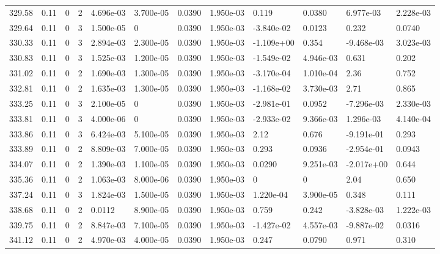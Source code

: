 \documentclass[preview]{standalone}
\begin{document}
{{{{{{{{{{{\begin{tabular}{L{1.2cm}C{1.2cm} C{0.3cm}C{0.5cm} C{1.4cm}C{1.4cm} C{1.4cm}C{1.4cm} C{1.6cm}C{1.6cm} C{1.6cm}C{1.6cm}}
  329.58  &  0.11  & 0     &  2 &  4.696e-03  & 3.700e-05  &  0.0390&   1.950e-03& 0.119 & 0.0380   &  6.977e-03 & 2.228e-03  \\ 
  329.64  &  0.11  & 0     &  3 &  1.500e-05  & 0  &  0.0390&   1.950e-03& -3.840e-02 & 0.0123   &  0.232 & 0.0740  \\ 
  330.33  &  0.11  & 0     &  3 &  2.894e-03  & 2.300e-05  &  0.0390&   1.950e-03& -1.109e+00 & 0.354   &  -9.468e-03 & 3.023e-03  \\ 
  330.83  &  0.11  & 0     &  3 &  1.525e-03  & 1.200e-05  &  0.0390&   1.950e-03& -1.549e-02 & 4.946e-03   &  0.631 & 0.202  \\ 
  331.02  &  0.11  & 0     &  2 &  1.690e-03  & 1.300e-05  &  0.0390&   1.950e-03& -3.170e-04 & 1.010e-04   &  2.36 & 0.752  \\ 
  332.81  &  0.11  & 0     &  2 &  1.635e-03  & 1.300e-05  &  0.0390&   1.950e-03& -1.168e-02 & 3.730e-03   &  2.71 & 0.865  \\ 
  333.25  &  0.11  & 0     &  3 &  2.100e-05  & 0  &  0.0390&   1.950e-03& -2.981e-01 & 0.0952   &  -7.296e-03 & 2.330e-03  \\ 
  333.81  &  0.11  & 0     &  3 &  4.000e-06  & 0  &  0.0390&   1.950e-03& -2.933e-02 & 9.366e-03   &  1.296e-03 & 4.140e-04  \\ 
  333.86  &  0.11  & 0     &  3 &  6.424e-03  & 5.100e-05  &  0.0390&   1.950e-03& 2.12 & 0.676   &  -9.191e-01 & 0.293  \\ 
  333.89  &  0.11  & 0     &  2 &  8.809e-03  & 7.000e-05  &  0.0390&   1.950e-03& 0.293 & 0.0936   &  -2.954e-01 & 0.0943  \\ 
  334.07  &  0.11  & 0     &  2 &  1.390e-03  & 1.100e-05  &  0.0390&   1.950e-03& 0.0290 & 9.251e-03   &  -2.017e+00 & 0.644  \\ 
  335.36  &  0.11  & 0     &  2 &  1.063e-03  & 8.000e-06  &  0.0390&   1.950e-03& 0 & 0   &  2.04 & 0.650  \\ 
  337.24  &  0.11  & 0     &  3 &  1.824e-03  & 1.500e-05  &  0.0390&   1.950e-03& 1.220e-04 & 3.900e-05   &  0.348 & 0.111  \\ 
  338.68  &  0.11  & 0     &  2 &  0.0112  & 8.900e-05  &  0.0390&   1.950e-03& 0.759 & 0.242   &  -3.828e-03 & 1.222e-03  \\ 
  339.75  &  0.11  & 0     &  2 &  8.847e-03  & 7.100e-05  &  0.0390&   1.950e-03& -1.427e-02 & 4.557e-03   &  -9.887e-02 & 0.0316  \\ 
  341.12  &  0.11  & 0     &  2 &  4.970e-03  & 4.000e-05  &  0.0390&   1.950e-03& 0.247 & 0.0790   &  0.971 & 0.310  \\ 

\end{tabular}}}}}}}}}}}}
\end{document}
